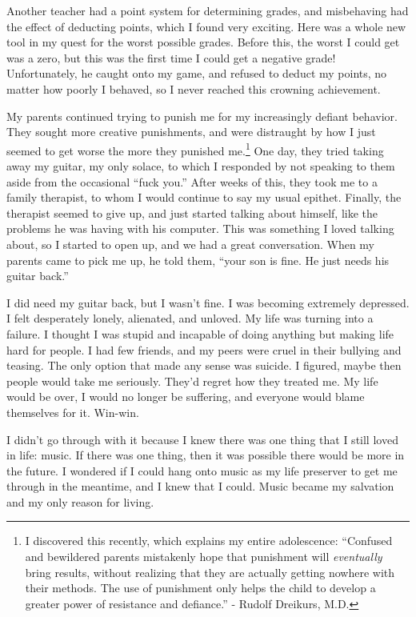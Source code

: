 Another teacher had a point system for determining grades, and misbehaving had the effect of deducting points, which I found very exciting. Here was a whole new tool in my quest for the worst possible grades. Before this, the worst I could get was a zero, but this was the first time I could get a negative grade! Unfortunately, he caught onto my game, and refused to deduct my points, no matter how poorly I behaved, so I never reached this crowning achievement.

My parents continued trying to punish me for my increasingly defiant behavior. They sought more creative punishments, and were distraught by how I just seemed to get worse the more they punished me.\footnote{I discovered this recently, which explains my entire adolescence: ``Confused and bewildered parents mistakenly hope that punishment will \emph{eventually} bring results, without realizing that they are actually getting nowhere with their methods. The use of punishment only helps the child to develop a greater power of resistance and defiance.'' - Rudolf Dreikurs, M.D.} One day, they tried taking away my guitar, my only solace, to which I responded by not speaking to them aside from the occasional ``fuck you.'' After weeks of this, they took me to a family therapist, to whom I would continue to say my usual epithet. Finally, the therapist seemed to give up, and just started talking about himself, like the problems he was having with his computer. This was something I loved talking about, so I started to open up, and we had a great conversation. When my parents came to pick me up, he told them, ``your son is fine. He just needs his guitar back.''

I did need my guitar back, but I wasn't fine. I was becoming extremely depressed. I felt desperately lonely, alienated, and unloved. My life was turning into a failure. I thought I was stupid and incapable of doing anything but making life hard for people. I had few friends, and my peers were cruel in their bullying and teasing. The only option that made any sense was suicide. I figured, maybe then people would take me seriously. They'd regret how they treated me. My life would be over, I would no longer be suffering, and everyone would blame themselves for it. Win-win.

I didn't go through with it because I knew there was one thing that I still loved in life: music. If there was one thing, then it was possible there would be more in the future. I wondered if I could hang onto music as my life preserver to get me through in the meantime, and I knew that I could. Music became my salvation and my only reason for living.

